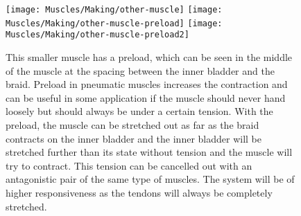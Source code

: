 \documentclass[main]{subfiles}
\begin{document}
\begin{figure}[H]
\centering
\texttt{[image: Muscles/Making/other-muscle]}
\texttt{[image: Muscles/Making/other-muscle-preload]}
\texttt{[image: Muscles/Making/other-muscle-preload2]}
\caption[Muscle with preload]{This smaller muscle has a preload, which can be seen in the middle of the muscle at the spacing between the inner bladder and the braid. Preload in pneumatic muscles increases the contraction and can be useful in some application if the muscle should never hand loosely but should always be under a certain tension. With the preload, the muscle can be stretched out as far as the braid contracts on the inner bladder and the inner bladder will be stretched further than its state without tension and the muscle will try to contract. This tension can be cancelled out with an antagonistic pair of the same type of muscles. The system will be of higher responsiveness as the tendons will always be completely stretched.}
\label{other-muscle}
\end{figure}
\end{document}
